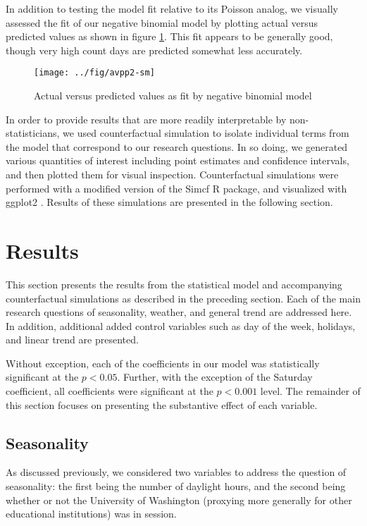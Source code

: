 \documentclass[12pt,letterpaper,article,twocolumn]{memoir}
\begin{document}
In addition to testing the model fit relative to its Poisson
analog, we visually assessed the fit of our negative binomial model by
plotting actual versus predicted values as shown in figure
\ref{fg:avp}. This fit appears to be generally good, though very high
count days are predicted somewhat less accurately.

\begin{figure}[h!]
  \centering
  \texttt{[image: ../fig/avpp2-sm]}
  \caption{Actual versus predicted values as fit by negative binomial model}
  \label{fg:avp}
\end{figure}

In order to provide results that are more readily interpretable by
non-statisticians, we used counterfactual simulation to isolate
individual terms from the model that correspond to our research
questions. In so doing, we generated various quantities of interest
including point estimates and confidence intervals, and then plotted
them for visual inspection. Counterfactual simulations were performed
with a modified version of the Simcf R package, and visualized with
ggplot2 \parencite{Adolph:2014aa,Schmiedeskamp:aa,Wickham:2009aa}.
Results of these simulations are presented in the following section.

\section*{Results}
% 
% 
This section presents the results from the statistical model and
accompanying counterfactual simulations as described in the preceding
section. Each of the main research questions of seasonality, weather,
and general trend are addressed here. In addition, additional added
control variables such as day of the week, holidays, and linear trend
are presented.

Without exception, each of the coefficients in our model was
statistically significant at the $p < 0.05$. Further, with the
exception of the Saturday coefficient, all coefficients were
significant at the $p < 0.001$ level. The remainder of this section
focuses on presenting the substantive effect of each variable.

\subsection*{Seasonality}
As discussed previously, we considered two variables to address the
question of seasonality: the first being the number of daylight hours,
and the second being whether or not the University of Washington
(proxying more generally for other educational institutions) was in
session.
\end{document}
